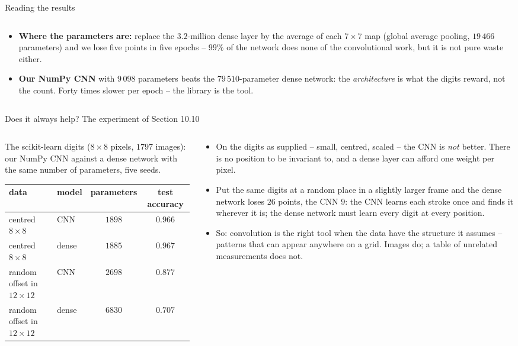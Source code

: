 \documentclass[10pt,aspectratio=169]{beamer}
\begin{document}
\begin{frame}{Reading the results}
\begin{columns}[T]
\begin{column}{0.48\textwidth}
\begin{itemize}
  \item \textbf{Where the parameters are:} replace the $3.2$-million dense
        layer by the average of each $7\times7$ map (global average
        pooling, $19\,466$ parameters) and we lose five points in five
        epochs -- $99\%$ of the network does none of the convolutional
        work, but it is not pure waste either.
  \item \textbf{Our NumPy CNN} with $9\,098$ parameters beats the
        $79\,510$-parameter dense network: the \emph{architecture} is what
        the digits reward, not the count.  Forty times slower per epoch --
        the library is the tool.
\end{itemize}
\end{column}
\end{columns}
\end{frame}

\begin{frame}{Does it always help?  The experiment of Section 10.10}
\small
\begin{columns}[T]
\begin{column}{0.5\textwidth}
The scikit-learn digits ($8\times8$ pixels, $1797$ images): our NumPy CNN
against a dense network with the same number of parameters, five seeds.
\begin{center}
\scriptsize
\begin{tabular}{@{}llcc@{}}
\toprule
data & model & parameters & test accuracy\\
\midrule
centred $8\times8$ & CNN & $1898$ & $0.966$\\
centred $8\times8$ & dense & $1885$ & $0.967$\\
\midrule
random offset in $12\times12$ & CNN & $2698$ & $\mathbf{0.877}$\\
random offset in $12\times12$ & dense & $6830$ & $0.707$\\
\bottomrule
\end{tabular}
\end{center}
\end{column}
\begin{column}{0.48\textwidth}
\begin{itemize}
  \item On the digits as supplied -- small, centred, scaled -- the CNN is
        \emph{not} better.  There is no position to be invariant to, and a
        dense layer can afford one weight per pixel.
  \item Put the same digits at a random place in a slightly larger frame
        and the dense network loses $26$ points, the CNN $9$: the CNN
        learns each stroke once and finds it wherever it is; the dense
        network must learn every digit at every position.
  \item So: convolution is the right tool when the data have the structure
        it assumes -- patterns that can appear anywhere on a grid.  Images
        do; a table of unrelated measurements does not.
\end{itemize}
\end{column}
\end{columns}
\end{frame}
\end{document}
